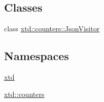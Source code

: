 \subsection*{Classes}
\begin{DoxyCompactItemize}
\item 
class \hyperlink{classxtd_1_1counters_1_1JsonVisitor}{xtd\-::counters\-::\-Json\-Visitor}
\end{DoxyCompactItemize}
\subsection*{Namespaces}
\begin{DoxyCompactItemize}
\item 
\hyperlink{namespacextd}{xtd}
\item 
\hyperlink{namespacextd_1_1counters}{xtd\-::counters}
\end{DoxyCompactItemize}
